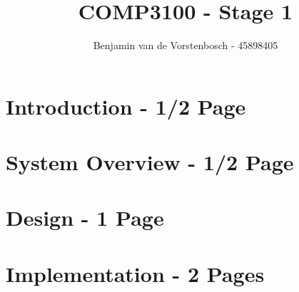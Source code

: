 \documentclass{article}
\title{COMP3100 - Stage 1}
\author{Benjamin van de Vorstenbosch - 45898405}
\begin{document}
\maketitle

\section{Introduction - 1/2 Page}


\section{System Overview - 1/2 Page}


\section{Design - 1 Page}


\section{Implementation - 2 Pages}


\raggedright
\nocite{*}
\printbibliography[]
\end{document}
